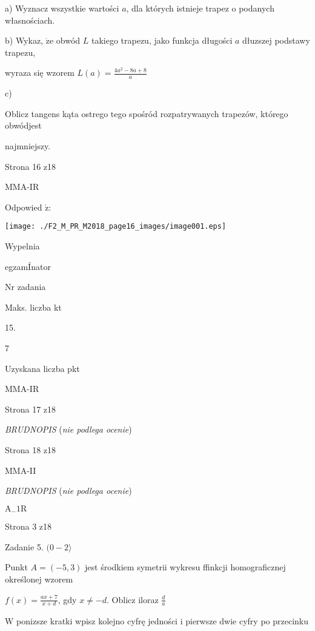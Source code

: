 \documentclass[a4paper,12pt]{article}
\begin{document}
a) Wyznacz wszystkie wartości $a$, dla których istnieje trapez o podanych własnościach.

b) Wykaz, $\dot{\mathrm{z}}\mathrm{e}$ obwód $L$ takiego trapezu, jako funkcja długości $a$ dłuzszej podstawy trapezu,

wyraza się wzorem $L(a)=\displaystyle \frac{4a^{2}-8a+8}{a}$

c)

Oblicz tangens kąta ostrego tego spośród rozpatrywanych trapezów, którego obwódjest

najmniejszy.

Strona 16 z18

MMA-IR





Odpowied $\acute{\mathrm{z}}$:
\begin{center}
\texttt{[image: ./F2\_M\_PR\_M2018\_page16\_images/image001.eps]}
\end{center}
Wypelnia

egzamÍnator

Nr zadania

Maks. liczba kt

15.

7

Uzyskana liczba pkt

MMA-IR

Strona 17 z18





{\it BRUDNOPIS} ({\it nie podlega ocenie})

Strona 18 z18

MMA-II





{\it BRUDNOPIS} ({\it nie podlega ocenie})

$\mathrm{A}_{-}1\mathrm{R}$

Strona 3 z18





Zadanie 5. $(0-2\rangle$

Punkt $A=(-5,3)$ jest środkiem symetrii wykresu ffinkcji homograficznej określonej wzorem

$f(x)=\displaystyle \frac{ax+7}{x+d}$, gdy $x\neq-d$. Oblicz iloraz $\displaystyle \frac{d}{a}$

$\mathrm{W}$ ponizsze kratki wpisz kolejno cyfrę jedności i pierwsze dwie cyfry po przecinku
\end{document}
